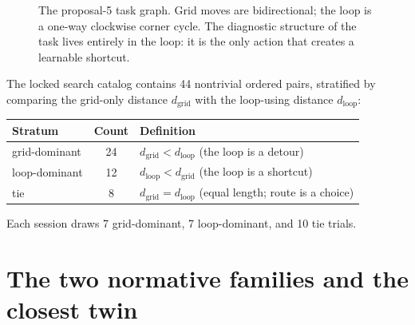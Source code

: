 \documentclass[10pt]{article}
\begin{document}
\begin{figure}[htbp]
\centering
{}
\caption{The proposal-5 task graph. Grid moves are bidirectional; the loop is a one-way
clockwise corner cycle. The diagnostic structure of the task lives entirely in the loop:
it is the only action that creates a learnable shortcut.}
\label{fig:task}
\end{figure}

The locked search catalog contains 44 nontrivial ordered pairs, stratified by comparing
the grid-only distance $d_{\mathrm{grid}}$ with the loop-using distance $d_{\mathrm{loop}}$:
\begin{center}\small
\begin{tabular}{@{}lcl@{}}
\toprule
Stratum & Count & Definition \\
\midrule
grid-dominant & 24 & $d_{\mathrm{grid}}<d_{\mathrm{loop}}$ (the loop is a detour) \\
loop-dominant & 12 & $d_{\mathrm{loop}}<d_{\mathrm{grid}}$ (the loop is a shortcut) \\
tie           & 8  & $d_{\mathrm{grid}}=d_{\mathrm{loop}}$ (equal length; route is a choice) \\
\bottomrule
\end{tabular}
\end{center}
Each session draws 7 grid-dominant, 7 loop-dominant, and 10 tie trials.

\section{The two normative families and the closest twin}
\end{document}
